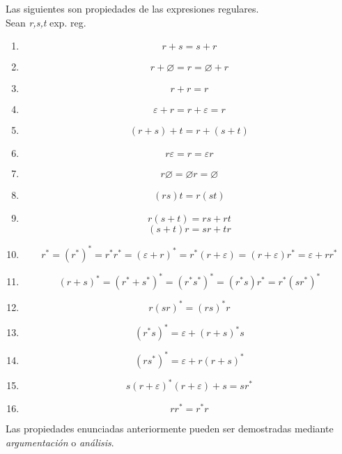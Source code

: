 
Las siguientes son propiedades de las expresiones regulares.\\
Sean \textit{r,s,t} exp. reg.
\begin{enumerate}
  \item \[r + s = s + r\]
  \item \[r + \varnothing = r = \varnothing + r\]
  \item \[ r + r = r\]
  \item \[\varepsilon + r = r + \varepsilon = r\]
  \item \[(r + s) + t = r + (s + t)\]
  \item \[r \varepsilon = r = \varepsilon r\]
  \item \[r \varnothing = \varnothing r = \varnothing\]
  \item \[(rs)t = r(st)\]
  \item \[r(s + t) = rs + rt\] \[(s + t)r = sr + tr\]
  \item \[r^* = (r^*)^* = r^* r^* = (\varepsilon + r)^* = r^*(r + \varepsilon) = (r + \varepsilon)r^* = \varepsilon + rr^*\]
  \item \[(r + s)^* = (r^* + s^*)^* = (r^*s^*)^* = (r^*s)r^* = r^*(sr^*)^*\]
  \item \[r(sr)^* = (rs)^*r\]
  \item \[(r^*s)^* = \varepsilon + (r + s)^*s\]
  \item \[(r s^*)^* = \varepsilon + r(r + s)^*\]
  \item \[s(r + \varepsilon)^* (r + \varepsilon) + s = s r^*\]
  \item \[rr^* = r^*r\]
\end{enumerate}

Las propiedades enunciadas anteriormente pueden ser demostradas mediante \textit{argumentación} o \textit{análisis}.
